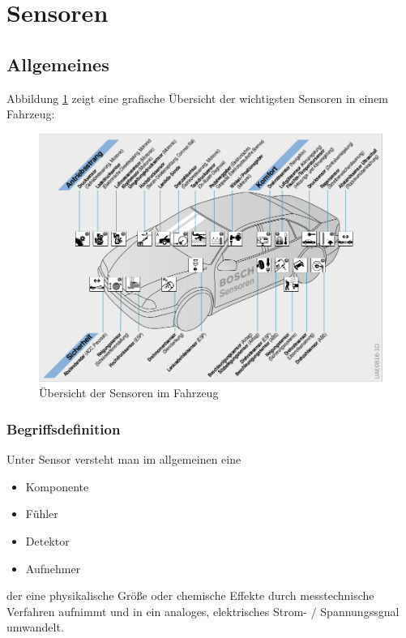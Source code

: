 \graphicspath{{./Images/Kapitel5/}}

	\section{Sensoren}
		\subsection{Allgemeines} 
		
		Abbildung \ref{fig:TS01} zeigt eine grafische Übersicht der wichtigsten Sensoren in einem Fahrzeug:
				
		\begin{figure}[h!]
			\includegraphics[width=\textwidth] {sensor_uebersicht.png}
	        \caption{Übersicht der Sensoren im Fahrzeug \cite{BP01}}
	        \label{fig:TS01}
		\end{figure}	
		
			\subsubsection{Begriffsdefinition}
		
	        Unter Sensor versteht man im allgemeinen eine
	        \begin{itemize}
	            \item Komponente
	            \item Fühler
	            \item Detektor
	            \item Aufnehmer
	        \end{itemize}
	            der eine physikalische Größe oder chemische Effekte durch messtechnische Verfahren aufnimmt und in ein analoges, elektrisches Strom- / Spannungssgnal umwandelt.
	        
